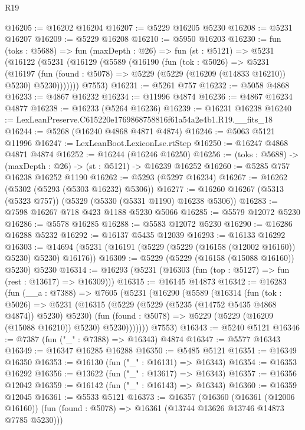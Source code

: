 \begin{lexlean}{R19}
\begin{coremodule}
@16205 := @16202 @16204
@16207 := @5229 @16205 @5230
@16208 := @5231 @16207
@16209 := @5229 @16208
@16210 := @5950 @16203
@16230 := fun (toks : @5688) =>
  fun (maxDepth : @26) =>
  fun (st : @5121) =>
  @5231
    (@16122
      (@5231
        (@16129
          (@5589
            (@16190
              (fun (tok : @5026) =>
              @5231
                (@16197
                  (fun (found : @5078) => @5229 (@5229 (@16209 (@14833 @16210)) @5230) @5230)))))))
      @7553)
@16231 := @5261 @757
@16232 := @5058 @4868
@16233 := @4867 @16232
@16234 := @11996 @4874
@16236 := @4867 @16234 @4877
@16238 := @16233 (@5264 @16236)
@16239 := @16231 @16238
@16240 := LexLeanPreserve.C615220e1769868758816f61a54a2e4b1.R19.__fits_18
@16244 := @5268 (@16240 @4868 @4871 @4874)
@16246 := @5063 @5121 @11996
@16247 := LexLeanBoot.LexiconLse.rtStep
@16250 := @16247 @4868 @4871 @4874
@16252 := @16244 (@16246 @16250)
@16256 := (toks : @5688) -> (maxDepth : @26) -> (st : @5121) -> @16239 @16252
@16260 := @5285 @757 @16238 @16252 @1190
@16262 := @5293 (@5297 @16234)
@16267 := @16262 (@5302 (@5293 (@5303 @16232) @5306))
@16277 := @16260 @16267 (@5313 (@5323 @757)) (@5329 (@5330 (@5331 @1190) @16238 @5306))
@16283 := @7598 @16267 @718 @423 @1188 @5230 @5066
@16285 := @5579 @12072 @5230
@16286 := @5578 @16285
@16288 := @5583 @12072 @5230
@16290 := @16286 @16288 @5232
@16292 := @16137 @5435 @12039
@16293 := @16133 @16292
@16303 := @14694 (@5231 (@16191 (@5229 (@5229 (@16158 (@12002 @16160)) @5230) @5230) @16176))
@16309 := @5229 (@5229 (@16158 (@15088 @16160)) @5230) @5230
@16314 := @16293 (@5231 (@16303 (fun (top : @5127) => fun (rest : @13617) => @16309)))
@16315 := @16145 @14873
@16342 := @16283
    (fun (__a : @7388) =>
    @7605
      (@5231
        (@16290
          (@5589
            (@16314
              (fun (tok : @5026) =>
              @5231
                (@16315
                  (@5229 (@5229 (@5235 (@14752 @5435 @4868 @4874)) @5230) @5230)
                  (fun (found : @5078) => @5229 (@5229 (@16209 (@15088 @16210)) @5230) @5230)))))))
      @7553)
@16343 := @5240 @5121
@16346 := @7387 (fun ("_" : @7388) => @16343) @4874
@16347 := @5577 @16343
@16349 := @16347 @16285 @16288
@16350 := @5485 @5121
@16351 := @16349 @16350
@16353 := @16130 (fun ("_" : @16131) => @16343)
@16354 := @16353 @16292
@16356 := @13622 (fun ("_" : @13617) => @16343)
@16357 := @16356 @12042
@16359 := @16142 (fun ("_" : @16143) => @16343)
@16360 := @16359 @12045
@16361 := @5533 @5121
@16373 := @16357
    (@16360
      (@16361 (@12006 @16160))
      (fun (found : @5078) => @16361 (@13744 @13626 @13746 @14873 @7785 @5230)))

\end{coremodule}
\end{lexlean}

